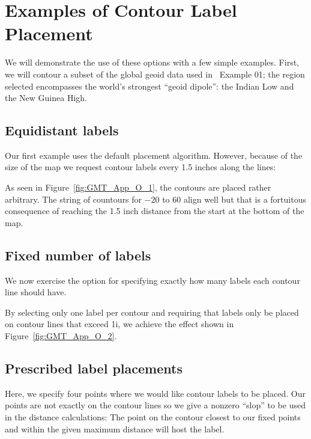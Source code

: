 \section{Examples of Contour Label Placement}

We will demonstrate the use of these options with a few simple examples.
First, we will contour a subset of the global geoid data used in \GMT\ Example 01;
the region selected encompasses the world's strongest ``geoid dipole'': the Indian Low
and the New Guinea High.

\subsection{Equidistant labels}

Our first example uses the default placement algorithm.  However, because of the size
of the map we request contour labels every 1.5 inches along the lines:



As seen in Figure~\ref{fig:GMT_App_O_1}, the contours are placed rather arbitrary.
The string of countours for $-20$ to $60$ align well but that is a fortuitous 
consequence of reaching the 1.5 inch distance from the start at the bottom of the map.


\subsection{Fixed number of labels}

We now exercise the option for specifying exactly how many labels each contour line
should have.



By selecting only one label per contour and requiring that labels only be placed on
contour lines that exceed 1i, we achieve the effect shown in Figure~\ref{fig:GMT_App_O_2}.


\subsection{Prescribed label placements}

Here, we specify four points where we would like contour labels to be placed.  Our points
are not exactly on the contour lines so we give a nonzero ``slop'' to be used in the
distance calculations: The point on the contour closest to our fixed points and within
the given maximum distance will host the label.


